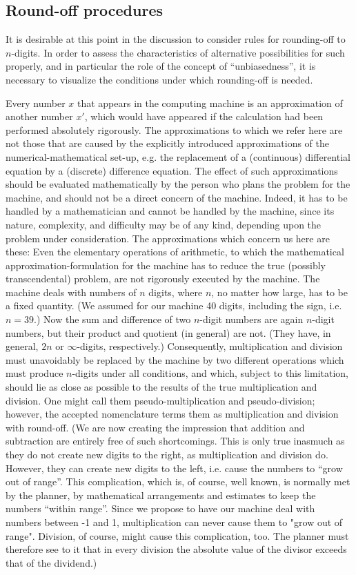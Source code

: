 \documentclass[12pt]{amsart}
\begin{document}
\subsection{Round-off procedures}
It is desirable at this point in the discussion to consider rules for rounding-off to $n$-digits. In order to assess the characteristics of alternative possibilities for such properly, and in particular the role of the concept of ``unbiasedness'', it is necessary to visualize the conditions under which rounding-off is needed.

Every number $x$ that appears in the computing machine is an approximation of another number $x'$, which would have appeared if the calculation had been performed absolutely rigorously. The approximations to which we refer here are not those that are caused by the explicitly introduced approximations of the numerical-mathematical set-up, e.g. the replacement of a (continuous) differential equation by a (discrete) difference equation. The effect of such approximations should be evaluated mathematically by the person who plans the problem for the machine, and should not be a direct concern of the machine. Indeed, it has to be handled by a mathematician and cannot be handled by the machine, since its nature, complexity, and difficulty may be of any kind, depending upon the problem under consideration. The approximations which concern us here are these: Even the elementary operations of arithmetic, to which the mathematical approximation-formulation for the machine has to reduce the true (possibly transcendental) problem, are not rigorously executed by the machine. The machine deals with numbers of $n$ digits, where $n$, no matter how large, has to be a fixed quantity. (We assumed for our machine 40 digits, including the sign, i.e. $n = 39$.) Now the sum and difference of two $n$-digit numbers are again $n$-digit numbers, but their product and quotient (in general) are not. (They have, in general, $2n$ or $\infty$-digits, respectively.) Consequently, multiplication and division must unavoidably be replaced by the machine by two different operations which must produce $n$-digits under all conditions, and which, subject to this limitation, should lie as close as possible to the results of the true multiplication and division. One might call them pseudo-multiplication and pseudo-division; however, the accepted nomenclature terms them as multiplication and division with round-off. (We are now creating the impression that addition and subtraction are entirely free of such shortcomings. This is only true inasmuch as they do not create new digits to the right, as multiplication and division do. However, they can create new digits to the left, i.e. cause the numbers to ``grow out of range''. This complication, which is, of course, well known, is normally met by the planner, by mathematical arrangements and estimates to keep the numbers ``within range''. Since we propose to have our machine deal with numbers between -1 and 1, multiplication can never cause them to "grow out of range". Division, of course, might cause this complication, too. The planner must therefore see to it that in every division the absolute value of the divisor exceeds that of the dividend.)
\end{document}
